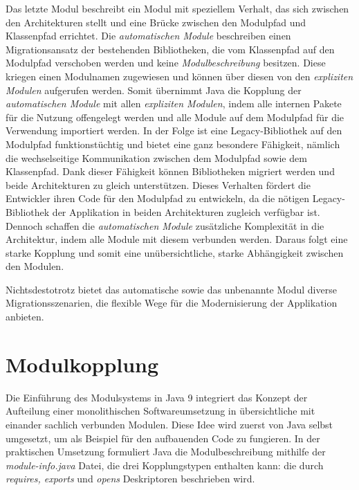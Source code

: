     Das letzte Modul beschreibt ein Modul mit speziellem Verhalt, das sich zwischen den Architekturen stellt und eine Brücke zwischen den Modulpfad und Klassenpfad errichtet. Die \textit{automatischen Module} beschreiben einen Migrationsansatz der bestehenden Bibliotheken, die vom Klassenpfad auf den Modulpfad verschoben werden und keine \textit{Modulbeschreibung} besitzen. Diese kriegen einen Modulnamen zugewiesen und können über diesen von den \textit{expliziten Modulen} aufgerufen werden. Somit übernimmt Java die Kopplung der \textit{automatischen Module} mit allen \textit{expliziten Modulen}, indem alle internen Pakete für die Nutzung offengelegt werden und alle Module auf dem Modulpfad für die Verwendung importiert werden. In der Folge ist eine Legacy-Bibliothek auf den Modulpfad funktionstüchtig und bietet eine ganz besondere Fähigkeit, nämlich die wechselseitige Kommunikation zwischen dem Modulpfad sowie dem Klassenpfad. Dank dieser Fähigkeit können Bibliotheken migriert werden und beide Architekturen zu gleich unterstützen. Dieses Verhalten fördert die Entwickler ihren Code für den Modulpfad zu entwickeln, da die nötigen Legacy-Bibliothek der Applikation in beiden Architekturen zugleich verfügbar ist.\newline 
    Dennoch schaffen die \textit{automatischen Module} zusätzliche Komplexität in die Architektur, indem alle Module mit diesem verbunden werden. Daraus folgt eine starke Kopplung und somit eine unübersichtliche, starke Abhängigkeit zwischen den Modulen.\cite{modulMitJava9,java9modRevealed,modulProgJava9}\bigbreak

    Nichtsdestotrotz bietet das automatische sowie das unbenannte Modul diverse Migrationsszenarien, die flexible Wege für die Modernisierung der Applikation anbieten. 

  \section{Modulkopplung} \label{sec:mod_kop}
    Die Einführung des Modulsystems in Java 9 integriert das Konzept der Aufteilung einer monolithischen Softwareumsetzung in übersichtliche mit einander sachlich verbunden Modulen. Diese Idee wird zuerst von Java selbst umgesetzt, um als Beispiel für den aufbauenden Code zu fungieren. In der praktischen Umsetzung formuliert Java die Modulbeschreibung mithilfe der \textit{module-info.java} Datei, die drei Kopplungstypen enthalten kann: die durch \textit{requires, exports} und \textit{opens} Deskriptoren beschrieben wird.

